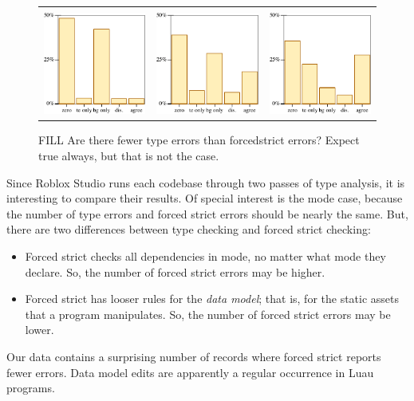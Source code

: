 \documentclass[english,submission,cleveref]{programming}
\begin{document}
\begin{figure}[t]\centering
  \begin{tabular}{lll}
    \mnocheck{} & \mnonstrict{} & \mstrict{} \\
    \includegraphics[width=0.3\columnwidth]{img/compass-nocheck.pdf}
    &
    \includegraphics[width=0.3\columnwidth]{img/compass-nonstrict.pdf}
    &
    \includegraphics[width=0.3\columnwidth]{img/compass-strict.pdf}
  \end{tabular}
  \caption{FILL Are there fewer type errors than forcedstrict errors? Expect true always, but that is not the case.}
  \label{f:tefs-compass}
\end{figure}

Since Roblox Studio runs each codebase through two passes of type analysis,
it is interesting to compare their results.
Of special interest is the \mstrict{} mode case, because the number of
type errors and forced strict errors should be nearly the same.
But, there are two differences between \mstrict{} type checking
and forced strict checking:
\begin{itemize}
  \item
    Forced strict checks all dependencies in \mstrict{} mode, no matter
    what mode they declare.
    So, the number of forced strict errors may be higher.
  \item
    Forced strict has looser rules for the \emph{data model};
    that is, for the static assets that a program manipulates.
    So, the number of forced strict errors may be lower.
\end{itemize}
Our data contains a surprising number of records where forced strict
reports fewer errors.
Data model edits are apparently a regular occurrence in Luau programs.
\end{document}
